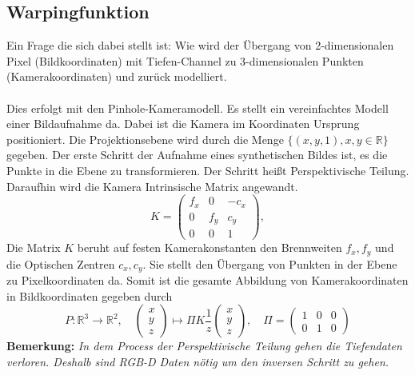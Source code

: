 \documentclass[12pt,DIV=15,BCOR=15mm,twoside,headsepline,abstract=true,listof=totoc,bibliography=totoc]{scrreprt}
\theoremstyle{remark}    %
\begin{document}
    \subsection{Warpingfunktion}
    Ein Frage die sich dabei stellt ist: Wie wird der Übergang von 2-dimensionalen Pixel (Bildkoordinaten) mit Tiefen-Channel zu 3-dimensionalen Punkten 
    (Kamerakoordinaten) und zurück modelliert.\\\\
    Dies erfolgt mit den Pinhole-Kameramodell. Es stellt ein vereinfachtes Modell einer Bildaufnahme da. Dabei ist die Kamera im Koordinaten
    Ursprung positioniert. Die Projektionsebene wird durch die Menge $\{(x,y,1), x,y \in \mathbb{R}\}$ gegeben. 
    Der erste Schritt der Aufnahme eines synthetischen Bildes ist, es die Punkte in die Ebene zu transformieren. Der
    Schritt heißt Perspektivische Teilung.
    Daraufhin wird die Kamera Intrinsische Matrix angewandt.
    \[
    K =  \begin{pmatrix}
        f_x & 0 & -c_x \\[6pt]
        0 & f_y & c_y \\[6pt]
        0 & 0 & 1
        \end{pmatrix},
    \]    
    Die Matrix $K$ beruht auf festen Kamerakonstanten den Brennweiten $f_x, f_y$ und die Optischen Zentren $c_x, c_y$. Sie stellt den Übergang von Punkten 
    in der Ebene zu Pixelkoordinaten da.
    Somit ist die gesamte Abbildung von Kamerakoordinaten in Bildkoordinaten gegeben durch \cite{djema2023densevisualodometryusing}
    \[  
       P: \mathbb{R}^3 \to \mathbb{R}^2, \hspace{1em} \begin{pmatrix} x\\y\\z \end{pmatrix} \mapsto \Pi K \frac{1}{z} \begin{pmatrix} x\\y\\z \end{pmatrix}
       , \hspace{1em} \Pi = \begin{pmatrix}1 & 0 & 0 \\ 0 & 1 & 0 \end{pmatrix}
    \]
    \textbf{Bemerkung:} \emph{In dem Process der Perspektivische Teilung gehen die Tiefendaten verloren. Deshalb sind RGB-D Daten nötig um den inversen 
    Schritt zu gehen.}\\\\
\end{document}
